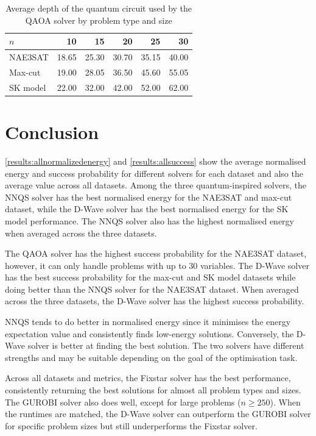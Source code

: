 \begin{table}[!htb]
    \centering
    \begin{tabular}{lrrrrr} \toprule
        $n$ & 10 & 15 & 20 & 25 & 30\\ \midrule
        NAE3SAT & 18.65 & 25.30 & 30.70 & 35.15 & 40.00 \\
        Max-cut & 19.00 & 28.05 & 36.50 & 45.60 & 55.05 \\
        SK model & 22.00 & 32.00 & 42.00 & 52.00 & 62.00\\ \bottomrule
    \end{tabular}
    \caption{Average depth of the quantum circuit used by the QAOA solver by problem type and size}
    \label{table:depth}
\end{table}

\section{Conclusion}
\autoref{results:allnormalizedenergy} and \autoref{results:allsuccess} show the average normalised energy and success probability for different solvers for each dataset and also the average value across all datasets. Among the three quantum-inspired solvers, the NNQS solver has the best normalised energy for the NAE3SAT and max-cut dataset, while the D-Wave solver has the best normalised energy for the SK model performance. The NNQS solver also has the highest normalised energy when averaged across the three datasets. 

The QAOA solver has the highest success probability for the NAE3SAT dataset, however, it can only handle problems with up to $30$ variables. The D-Wave solver has the best success probability for the max-cut and SK model datasets while doing better than the NNQS solver for the NAE3SAT dataset. When averaged across the three datasets, the D-Wave solver has the highest success probability.

NNQS tends to do better in normalised energy since it minimises the energy expectation value and consistently finds low-energy solutions. Conversely, the D-Wave solver is better at finding the best solution. The two solvers have different strengths and may be suitable depending on the goal of the optimisation task.

Across all datasets and metrics, the Fixstar solver has the best performance, consistently returning the best solutions for almost all problem types and sizes. The GUROBI solver also does well, except for large problems ($n\geq 250$). When the runtimes are matched, the D-Wave solver can outperform the GUROBI solver for specific problem sizes but still underperforms the Fixstar solver. 

